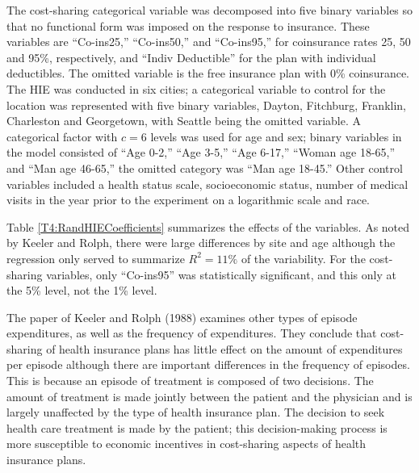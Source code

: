 The cost-sharing categorical variable was decomposed into five
binary variables so that no functional form was imposed on the
response to insurance. These variables are ``Co-ins25,''
``Co-ins50,'' and ``Co-ins95,'' for coinsurance rates 25, 50 and
95\%, respectively, and ``Indiv Deductible'' for the plan with
individual deductibles. The omitted variable is the free insurance
plan with 0\% coinsurance. The HIE was conducted in six cities; a
categorical variable to control for the location was represented
with five binary variables, Dayton, Fitchburg, Franklin, Charleston
and Georgetown, with Seattle being the omitted variable. A
categorical factor with $c=6$ levels was used for age and sex;
binary variables in the model consisted of ``Age 0-2,'' ``Age 3-5,''
``Age 6-17,'' ``Woman age 18-65,'' and ``Man age 46-65,'' the
omitted category was ``Man age 18-45.'' Other control variables
included a health status scale, socioeconomic status, number of
medical visits in the year prior to the experiment on a logarithmic
scale and race.

Table \ref{T4:RandHIECoefficients} summarizes the effects of the
variables. As noted by Keeler and Rolph, there were large
differences by site and age although the regression only served to
summarize $R^2=11\%$ of the variability. For the cost-sharing
variables, only ``Co-ins95'' was statistically significant, and this
only at the 5\% level, not the 1\% level.

The paper of Keeler and Rolph (1988) examines other types of episode
expenditures, as well as the frequency of expenditures. They
conclude that cost-sharing of health insurance plans has little
effect on the amount of expenditures per episode although there are
important differences in the frequency of episodes. This is because
an episode of treatment is composed of two decisions. The amount of
treatment is made jointly between the patient and the physician and
is largely unaffected by the type of health insurance plan. The
decision to seek health care treatment is made by the patient; this
decision-making process is more susceptible to economic incentives
in cost-sharing aspects of health insurance plans.


